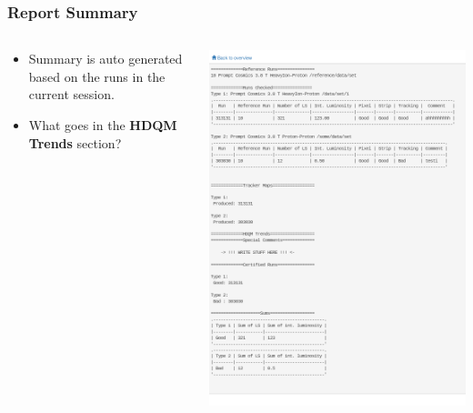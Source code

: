 \documentclass{beamer}
\begin{document}
\begin{frame}
  \frametitle{Report Summary}
  \begin{columns}[T]
    \begin{column}{.5\textwidth}
    \begin{block}{}
	\begin{itemize}
	\item Summary is auto generated based on the runs in the current session.
	\item What goes in the \textbf{HDQM Trends} section?
	\end{itemize}
   	\end{block}	
    \end{column}
    \begin{column}{.5\textwidth}
    \begin{block}{}
	\includegraphics[width=\textwidth]{figures/summary.png}
    \end{block}
  \end{column}
\end{columns}
\end{frame}
\end{document}
